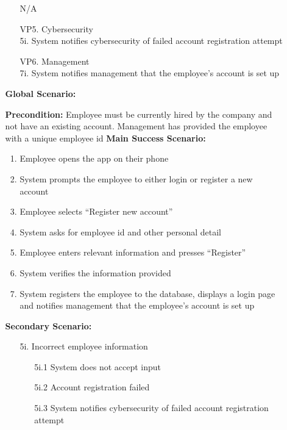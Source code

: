 \documentclass[]{article}
\begin{document}
\begin{enumerate}[{\bf BE1.}]
\begin{enumerate}[{\bf BE6.}]
\begin{enumerate}
            \indent N/A 
            \item[VP5.] Cybersecurity \\
            \indent 5i. System notifies cybersecurity of failed account registration attempt 
            \item[VP6.] Management \\
            \indent 7i. System notifies management that the employee’s account is set up 
        \end{enumerate}
        {\bf Global Scenario:}\\
        \begin{enumerate}
            \textbf{Precondition:} Employee must be currently hired by the company and not have an existing account. Management has provided the employee with a unique employee id 
            \textbf{Main Success Scenario:}
            \begin{enumerate}
                \item Employee opens the app on their phone 
                \item System prompts the employee to either login or register a new account 
                \item Employee selects “Register new account”
                \item System asks for employee id and other personal detail
                \item Employee enters relevant information and presses “Register” 
                \item System verifies the information provided
                \item System registers the employee to the database, displays a login page and notifies management that the employee’s account is set up
            \end{enumerate}
            \textbf{Secondary Scenario:}
            \begin{enumerate}
                \item[5i.] Incorrect employee information 
                \begin{enumerate}
                    \item[5i.1] System does not accept input
                    \item[5i.2] Account registration failed
                    \item[5i.3] System notifies cybersecurity of failed account registration attempt
                \end{enumerate}
            \end{enumerate}
        \end{enumerate}
\end{enumerate}


\end{enumerate}
\end{document}
